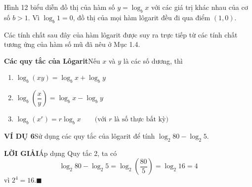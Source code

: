 \begin{minipage}[t]{0.708\textwidth}
    Hình 12 biểu diễn đồ thị của hàm số $y = \log_b x$ với các giá trị khác nhau của cơ số $b > 1$. Vì $\log_b 1 = 0$, đồ thị của mọi hàm lôgarit đều đi qua điểm $(1, 0)$.

    Các tính chất sau đây của hàm lôgarit được suy ra trực tiếp từ các tính chất tương ứng của hàm số mũ đã nêu ở Mục 1.4.

    \begin{definitionbox}
    \textbf{\textsf{\color{stewartred}Các quy tắc của Lôgarit}}\quad Nếu $x$ và $y$ là các số dương, thì
    \begin{enumerate}
        \item[\textbf{1.}] $\log_b(xy) = \log_b x + \log_b y$
        \item[\textbf{2.}] $\log_b\left(\dfrac{x}{y}\right) = \log_b x - \log_b y$
        \item[\textbf{3.}] $\log_b(x^r) = r\log_b x \qquad \text{(với $r$ là số thực bất kỳ)}$
    \end{enumerate}
    \end{definitionbox}

    \vspace{4pt}
    \noindent
    \textbf{\textsf{\color{stewartcyan}VÍ DỤ 6}}\quad Sử dụng các quy tắc của lôgarit để tính $\log_2 80 - \log_2 5$.

    \vspace{3pt}
    \noindent
    \textbf{\textsf{\color{stewartcyan}LỜI GIẢI}}\quad Áp dụng Quy tắc 2, ta có
    \[
    \log_2 80 - \log_2 5 = \log_2\left(\frac{80}{5}\right) = \log_2 16 = 4
    \]
    vì $2^4 = 16$.\hfill{\color{stewartcyan}$\blacksquare$}
\end{minipage}